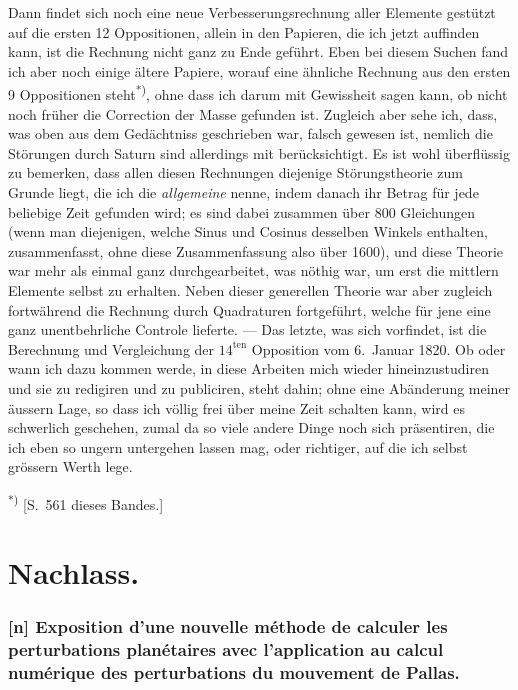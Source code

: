 \documentclass[12pt,a4paper]{article}
\begin{document}
\newpage
\setcounter{page}{448}
%
Dann findet sich noch eine neue Verbesserungsrechnung aller Elemente gestützt auf die ersten 12 Oppositionen, allein in den Papieren, die ich jetzt auffinden kann, ist die Rechnung nicht ganz zu Ende geführt. Eben bei diesem Suchen fand ich aber noch einige ältere Papiere, worauf eine ähnliche Rechnung aus den ersten 9 Oppositionen steht\textsuperscript{*)}, ohne dass ich darum mit Gewissheit sagen kann, ob nicht noch früher die Correction der Masse gefunden ist. Zugleich aber sehe ich, dass, was oben aus dem Gedächtniss geschrieben war, falsch gewesen ist, nemlich die Störungen durch Saturn sind allerdings mit berücksichtigt. Es ist wohl überflüssig zu bemerken, dass allen diesen Rechnungen diejenige Störungstheorie zum Grunde liegt, die ich die \textit{allgemeine} nenne, indem danach ihr Betrag für jede beliebige Zeit gefunden wird; es sind dabei zusammen über 800 Gleichungen (wenn man diejenigen, welche Sinus und Cosinus desselben Winkels enthalten, zusammenfasst, ohne diese Zusammenfassung also über 1600), und diese Theorie war mehr als einmal ganz durchgearbeitet, was nöthig war, um erst die mittlern Elemente selbst zu erhalten. Neben dieser generellen Theorie war aber zugleich fortwährend die Rechnung durch Quadraturen fortgeführt, welche für jene eine ganz unentbehrliche Controle lieferte. --- Das letzte, was sich vorfindet, ist die Berechnung und Vergleichung der $14^{\text{ten}}$ Opposition vom 6.~Januar 1820. Ob oder wann ich dazu kommen werde, in diese Arbeiten mich wieder hineinzustudiren und sie zu redigiren und zu publiciren, steht dahin; ohne eine Abänderung meiner äussern Lage, so dass ich völlig frei über meine Zeit schalten kann, wird es schwerlich geschehen, zumal da so viele andere Dinge noch sich präsentiren, die ich eben so ungern untergehen lassen mag, oder richtiger, auf die ich selbst grössern Werth lege.

\smallskip\noindent\textsuperscript{*)} [S.~561 dieses Bandes.]

\newpage
\setcounter{page}{449}
%
\part*{Nachlass.}

\section*{[n] Exposition d'une nouvelle méthode de calculer les perturbations planétaires avec l'application au calcul numérique des perturbations du mouvement de Pallas.}
\end{document}

